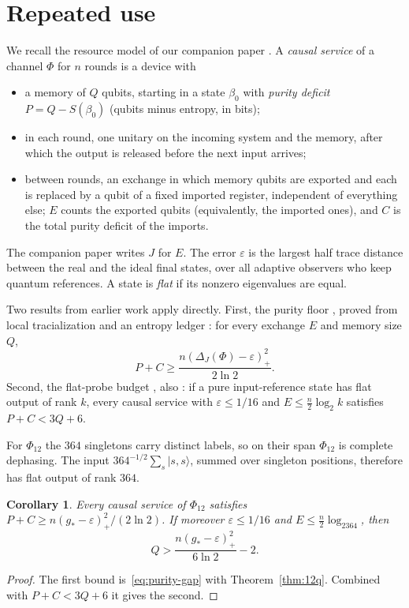\documentclass[11pt]{article}
\newtheorem{corollary}[theorem]{Corollary}
\newcommand{\eps}{\varepsilon}
\newcommand{\ket}[1]{\lvert #1\rangle}
\begin{document}
\section{Repeated use}\label{sec:memory}

We recall the resource model of our companion paper \cite[Definition~2.3]{DouglasMghirbiCausal}.  A \emph{causal service} of a channel $\Phi$ for $n$ rounds is a device with
\begin{itemize}
\item a memory of $Q$ qubits, starting in a state $\beta_0$ with \emph{purity deficit} $P=Q-S(\beta_0)$ (qubits minus entropy, in bits);
\item in each round, one unitary on the incoming system and the memory, after which the output is released before the next input arrives;
\item between rounds, an exchange in which memory qubits are exported and each is replaced by a qubit of a fixed imported register, independent of everything else; $E$ counts the exported qubits (equivalently, the imported ones), and $C$ is the total purity deficit of the imports.
\end{itemize}
The companion paper writes $J$ for $E$.  The error $\eps$ is the largest half trace distance between the real and the ideal final states, over all adaptive observers who keep quantum references.  A state is \emph{flat} if its nonzero eigenvalues are equal.

Two results from earlier work apply directly.  First, the purity floor \cite[Theorem~3.2(b)]{DouglasMghirbiCausal}, proved from local tracialization \cite[Lemma~5.4]{DouglasMghirbiCausal} and an entropy ledger \cite[Lemma~3.5]{DouglasMghirbiCausal}: for every exchange $E$ and memory size $Q$,
\begin{equation}\label{eq:purity-gap}
 P+C\ge\frac{n(\Delta_J(\Phi)-\eps)_+^2}{2\ln2}.
\end{equation}
Second, the flat-probe budget \cite[Proposition~13.1]{DouglasMghirbiC}, also \cite[Proposition~K.3]{MghirbiDouglasV1}: if a pure input-reference state has flat output of rank $k$, every causal service with $\eps\le1/16$ and $E\le\frac n2\log_2k$ satisfies $P+C<3Q+6$.

For $\Phi_{12}$ the $364$ singletons carry distinct labels, so on their span $\Phi_{12}$ is complete dephasing.  The input $364^{-1/2}\sum_s\ket{s,s}$, summed over singleton positions, therefore has flat output of rank $364$.

\begin{corollary}\label{cor:memory}
Every causal service of $\Phi_{12}$ satisfies $P+C\ge n(g_*-\eps)_+^2/(2\ln2)$.  If moreover $\eps\le1/16$ and $E\le\frac n2\log_2364$, then
\[
 Q>\frac{n(g_*-\eps)_+^2}{6\ln2}-2.
\]
\end{corollary}
\begin{proof}
The first bound is~\eqref{eq:purity-gap} with Theorem~\ref{thm:12q}.  Combined with $P+C<3Q+6$ it gives the second.
\end{proof}
\end{document}
